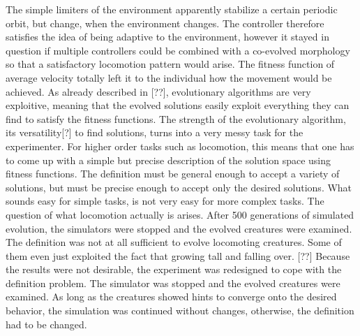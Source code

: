 \documentclass[main]{subfiles}
\begin{document}

The simple limiters of the environment apparently stabilize a certain periodic orbit, but change, when the environment changes. %
%
The controller therefore satisfies the idea of being adaptive to the environment, however it stayed in question if multiple controllers could be combined with a co-evolved morphology so that a satisfactory locomotion pattern would arise. %
%
The fitness function of average velocity totally left it to the individual how the movement would be achieved. %
%
As already described in [??], evolutionary algorithms are very exploitive, meaning that the evolved solutions easily exploit everything they can find to satisfy the fitness functions. %
%
The strength of the evolutionary algorithm, its versatility[?] to find solutions, turns into a very messy task for the experimenter. %
%
For higher order tasks such as locomotion, this means that one has to come up with a simple but precise description of the solution space using fitness functions. %
%
The definition must be general enough to accept a variety of solutions, but must be precise enough to accept only the desired solutions. %
%
What sounds easy for simple tasks, is not very easy for more complex tasks. The question of what locomotion actually is arises. %
%
After 500 generations of simulated evolution, the simulators were stopped and the evolved creatures were examined. %
%
The definition was not at all sufficient to evolve locomoting creatures. %
%
Some of them even just exploited the fact that growing tall and falling over. %
%
[??] Because the results were not desirable, the experiment was redesigned to cope with the definition problem. %
%
The simulator was stopped and the evolved creatures were examined. %
%
As long as the creatures showed hints to converge onto the desired behavior, the simulation was continued without changes, otherwise, the definition had to be changed. 
\end{document}
